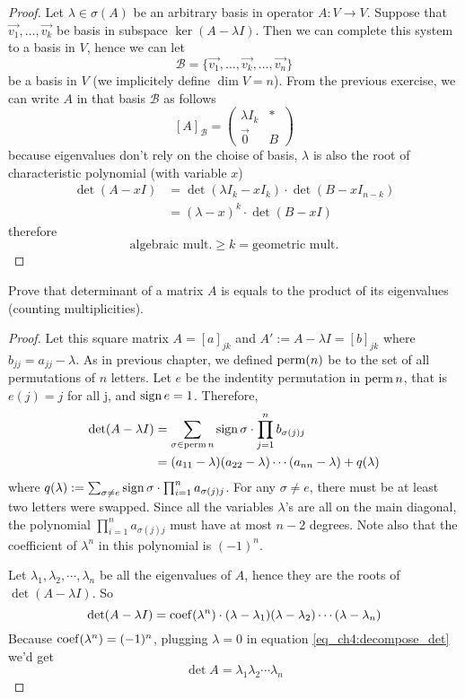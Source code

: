 \begin{proof}
  Let $\lambda\in\sigma(A)$ be an arbitrary basis in operator 
  $A:V\to V$. Suppose that $\vec{v_1},\dots,\vec{v_k}$ be basis 
  in subspace $\ker(A-\lambda I)$. Then we can complete this 
  system to a basis in $V$, hence we can let 
  \[
    \mathcal B=\{\vec{v_1},\dots,\vec{v_k},\dots, \vec{v_n}\}
  \]
  be a basis in $V$ (we implicitely define $\dim V=n$). From the previous
  exercise, we can write $A$ in that basis $\mathcal B$ as follows
  \[
    [A]_{\mathcal B}=
    \begin{pmatrix}
      \lambda I_k&*\\\vec{0}&B
    \end{pmatrix}
  \]
  because eigenvalues don't rely on the choise of basis, $\lambda$ is
  also the root of characteristic polynomial (with variable $x$)
  \begin{align*}
    \det(A-xI)
    &=\det(\lambda I_k-xI_k)\cdot\det(B-xI_{n-k})\\
    &=(\lambda-x)^k \cdot\det(B-xI)
  \end{align*}
  therefore
  \[
    \boxed{\text{algebraic mult.}\geq k=\text{geometric mult.}}
  \]
\end{proof}
\newpage
\begin{exercise}
  Prove that determinant of a matrix $A$ is equals to the
  product of its eigenvalues (counting multiplicities).
\end{exercise}
\begin{proof}
  Let this square matrix $A=[a]_{jk}$ and  
  $A':=A-\lambda I=[b]_{jk}$ where $b_{jj}=a_{jj}-\lambda$.
  As in previous chapter, we defined $\operatorname{perm}(n)$ be to the set of
  all permutations of $n$ letters. Let $e$ be the indentity
  permutation in $\operatorname{perm}{n}$, that is $e(j)=j$ for all j, and 
  $\operatorname{sign} e=1$. Therefore,
  \begin{align}
    \label{eq_ch4:decompose_det}
    \det(A-\lambda I)
    &=\sum_{\sigma\in\operatorname{perm} n}\operatorname{sign}\sigma\cdot
    \prod_{j=1}^{n}b_{\sigma(j)j}\notag\\
    &=(a_{11}-\lambda)(a_{22}-\lambda)\cdots(a_{nn}-\lambda)+q(\lambda)
  \end{align}
  where $q(\lambda):=\sum_{\sigma\neq e}\operatorname{sign}\sigma
  \cdot\prod_{i=1}^{n}a_{\sigma(j)j}$. For any $\sigma\neq e$,
  there must be at least two letters were swapped. Since all the 
  variables $\lambda$'s are all on the main diagonal, the polynomial
  $\prod_{i=1}^{n}a_{\sigma(j)j}$ must have at most $n-2$ degrees.
  Note also that the coefficient of $\lambda^n$ in this polynomial
  is $(-1)^n$.

  Let $\lambda_1,\lambda_2,\cdots,\lambda_n$ be all the eigenvalues of
  $A$, hence they are the roots of $\det(A-\lambda I)$. So
  \begin{equation}
    \label{eq_ch4:factor_det}
    \det(A-\lambda I)=\operatorname{coef}(\lambda^n)\cdot 
    (\lambda-\lambda_1)(\lambda-\lambda_2)\cdots(\lambda-\lambda_n)
  \end{equation}
  Because $\operatorname{coef}(\lambda^n)=(-1)^n$, plugging $\lambda=0$ in equation
  \eqref{eq_ch4:decompose_det} we'd get
  \[
    \boxed{\det A=\lambda_1\lambda_2\cdots\lambda_n}
  \]
\end{proof}
